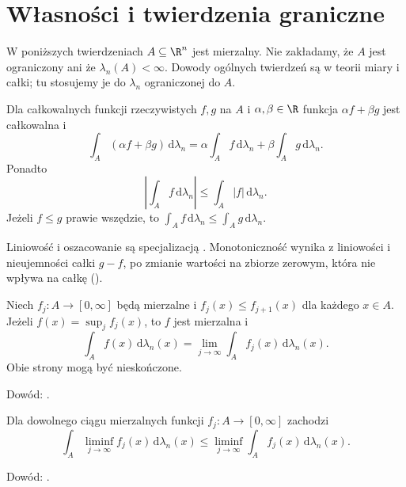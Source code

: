\section{Własności i twierdzenia graniczne}

W poniższych twierdzeniach $A\subseteq\R^n$
jest mierzalny. Nie zakładamy, że $A$
jest ograniczony ani że $\lambda_n(A)<\infty$.
Dowody ogólnych twierdzeń są w teorii miary
i całki; tu stosujemy je do $\lambda_n$
ograniczonej do $A$.

\begin{twierdzenie}
\label{ma2:thm:lebesgue-linearity}
Dla całkowalnych funkcji rzeczywistych $f,g$
na $A$ i $\alpha,\beta\in\R$ funkcja
$\alpha f+\beta g$ jest całkowalna i
\[
 \int_A(\alpha f+\beta g)\,\mathrm d\lambda_n
 =\alpha\int_A f\,\mathrm d\lambda_n+
 \beta\int_A g\,\mathrm d\lambda_n.
\]
Ponadto
\[
 \left|\int_A f\,\mathrm d\lambda_n\right|
 \le\int_A|f|\,\mathrm d\lambda_n.
\]
Jeżeli $f\le g$ prawie wszędzie, to
$\int_A f\,\mathrm d\lambda_n\le\int_A g\,\mathrm d\lambda_n$.
\end{twierdzenie}
Liniowość i oszacowanie są specjalizacją
.
Monotoniczność wynika z liniowości i nieujemności
całki $g-f$, po zmianie wartości na zbiorze zerowym,
która nie wpływa na całkę
().

\begin{twierdzenie}
\label{ma2:thm:lebesgue-monotone}
Niech $f_j:A\to[0,\infty]$ będą mierzalne
i $f_j(x)\le f_{j+1}(x)$ dla każdego $x\in A$.
Jeżeli $f(x)=\sup_j f_j(x)$, to $f$ jest
mierzalna i
\[
 \int_A f(x)\,\mathrm d\lambda_n(x)
 =\lim_{j\to\infty}\int_A f_j(x)\,\mathrm d\lambda_n(x).
\]
Obie strony mogą być nieskończone.
\end{twierdzenie}
Dowód: .

\begin{twierdzenie}
\label{ma2:thm:lebesgue-fatou}
Dla dowolnego ciągu mierzalnych funkcji
$f_j:A\to[0,\infty]$ zachodzi
\[
 \int_A\liminf_{j\to\infty} f_j(x)\,\mathrm d\lambda_n(x)
 \le\liminf_{j\to\infty}\int_A f_j(x)\,\mathrm d\lambda_n(x).
\]
\end{twierdzenie}
Dowód: .

